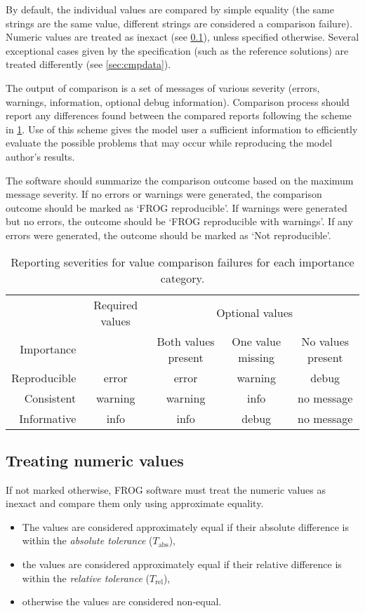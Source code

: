 By default, the individual values are compared by simple equality (the same strings are the same value, different strings are considered a comparison failure). Numeric values are treated as inexact (see \cref{sec:inexact}), unless specified otherwise. Several exceptional cases given by the specification (such as the reference solutions) are treated differently (see \cref{sec:cmpdata}).

The output of comparison is a set of messages of various severity (errors, warnings, information, optional debug information). Comparison process should report any differences found between the compared reports following the scheme in \cref{tab:importance}. Use of this scheme gives the model user a sufficient information to efficiently evaluate the possible problems that may occur while reproducing the model author's results.

The software should summarize the comparison outcome based on the maximum message severity. If no errors or warnings were generated, the comparison outcome should be marked as `FROG reproducible'. If warnings were generated but no errors, the outcome should be `FROG reproducible with warnings'. If any errors were generated, the outcome should be marked as `Not reproducible'.

\begin{table}\tablefont
\begin{tabular}{rcccc}
\toprule
 & Required values & \multicolumn{3}{c}{Optional values} \\ \cmidrule(rl){3-5}
Importance & & Both values present & One value missing & No values present \\
\midrule
Reproducible & error & error & warning & debug \\
Consistent & warning & warning & info & no message \\
Informative & info & info & debug & no message \\
\bottomrule
\end{tabular}
\caption[Comparison failure reporting levels]{Reporting severities for value comparison failures for each importance category.}
\label{tab:importance}
\end{table}

\subsection{Treating numeric values}
\label{sec:inexact}

If not marked otherwise, FROG software must treat the numeric values as inexact and compare them only using approximate equality.
\begin{itemize}
\item The values are considered approximately equal if their absolute difference is within the \emph{absolute tolerance} ($T_\text{abs}$),
\item the values are considered approximately equal if their relative difference is within the \emph{relative tolerance} ($T_\text{rel}$),
\item otherwise the values are considered non-equal.
\end{itemize}


